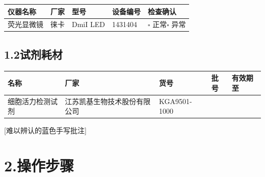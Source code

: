 \documentclass[UTF8,10pt,a4paper,fontset=fandol]{ctexart}
\newcommand{\fieldvalue}[1]{#1}
\newcommand{\handwritten}[1]{#1}
\begin{document}
\begin{tabularx}{\textwidth}{|X|X|X|X|X|}
\hline
仪器名称 & 厂家 & 型号 & 设备编号 & 检查确认 \\ \hline
\fieldvalue{荧光显微镜}
&
\fieldvalue{徕卡}
&
\fieldvalue{DmiI LED}
&
\fieldvalue{1431404}
& $\square$ 正常\quad $\square$ 异常 \\ \hline
\end{tabularx}

\subsection*{1.2\quad 试剂耗材}

\begin{tabularx}{\textwidth}{|X|X|X|X|X|}
\hline
名称 & 厂家 & 货号 & 批号 & 有效期至 \\ \hline
细胞活力检测试剂 &
\fieldvalue{江苏凯基生物技术股份有限公司}
&
\fieldvalue{KGA9501-1000}
& & \\ \hline
\end{tabularx}

\handwritten{[难以辨认的蓝色手写批注]}

\section*{2.\quad 操作步骤}
\end{document}

